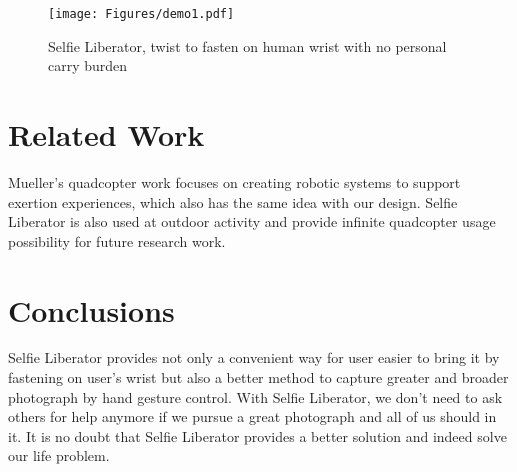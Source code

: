 \documentclass{sig-alternate-ipsn13}
\begin{document}
\begin{figure}
  \centering
  \texttt{[image: Figures/demo1.pdf]}
  \caption{Selfie Liberator, twist to fasten on human wrist with no personal carry burden }
  \label{fig:demo1}
\end{figure}

\section{Related Work}
Mueller's quadcopter work\cite{cite1} focuses on creating robotic systems to support exertion experiences, which also has the same idea with our design. Selfie Liberator is also used at outdoor activity and provide infinite quadcopter usage possibility for future research work.



\section{Conclusions}
Selfie Liberator provides not only a convenient way for user easier to bring it by fastening on user's wrist but also a better method to capture greater and broader photograph by hand gesture control. With Selfie Liberator, we don't need to ask others for help anymore if we pursue a great photograph and all of us should in it. It is no doubt that Selfie Liberator provides a better solution and indeed solve our life problem. 
\end{document}
